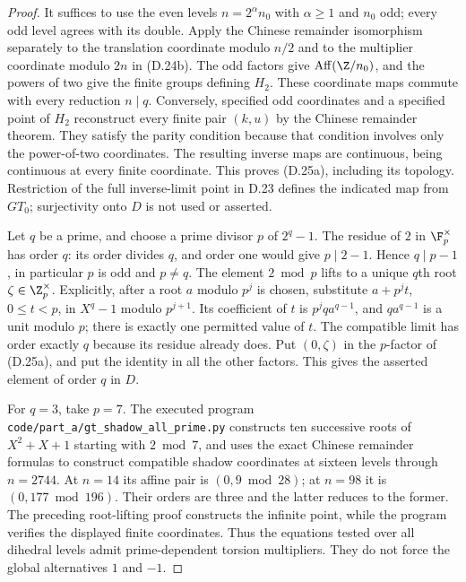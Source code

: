 \begin{proof}
It suffices to use the even levels $n=2^\alpha n_0$ with
$\alpha\geq1$ and $n_0$ odd; every odd level agrees with its
double. Apply the Chinese remainder isomorphism separately to
the translation coordinate modulo $n/2$ and to the multiplier
coordinate modulo $2n$ in (D.24b). The odd factors give
$\operatorname{Aff}(\Z/n_0)$, and the powers of two give
the finite groups defining $H_2$. These coordinate maps commute
with every reduction $n\mid q$. Conversely, specified odd
coordinates and a specified point of $H_2$ reconstruct every
finite pair $(k,u)$ by the Chinese remainder theorem. They
satisfy the parity condition because that condition involves
only the power-of-two coordinates. The resulting inverse
maps are continuous, being continuous at every finite
coordinate. This proves (D.25a), including its topology.
Restriction of the full inverse-limit point in D.23 defines
the indicated map from $GT_0$; surjectivity onto $D$ is not
used or asserted.

Let $q$ be a prime, and choose a prime divisor $p$ of $2^q-1$.
The residue of $2$ in $\F_p^\times$ has order $q$: its order
divides $q$, and order one would give $p\mid2-1$. Hence
$q\mid p-1$, in particular $p$ is odd and $p\ne q$.
The element $2\bmod p$ lifts to a unique $q$th root
$\zeta\in\Z_p^\times$. Explicitly, after a root $a$ modulo
$p^j$ is chosen, substitute $a+p^jt$, $0\leq t<p$,
in $X^q-1$ modulo $p^{j+1}$. Its coefficient of $t$ is
$p^jqa^{q-1}$, and $qa^{q-1}$ is a unit modulo $p$;
there is exactly one permitted value of $t$.
The compatible limit has order exactly $q$ because its
residue already does. Put $(0,\zeta)$ in the $p$-factor
of (D.25a), and put the identity in all the other factors.
This gives the asserted element of order $q$ in $D$.

For $q=3$, take $p=7$. The executed program
\texttt{code/part\_a/gt\_shadow\_all\_prime.py} constructs ten
successive roots of $X^2+X+1$ starting with $2\bmod7$, and
uses the exact Chinese remainder formulas to construct
compatible shadow coordinates at sixteen levels through
$n=2744$. At $n=14$ its affine pair is $(0,9\bmod28)$;
at $n=98$ it is $(0,177\bmod196)$. Their orders are three
and the latter reduces to the former. The preceding
root-lifting proof constructs the infinite point, while
the program verifies the displayed finite coordinates.
Thus the equations tested over all dihedral levels admit
prime-dependent torsion multipliers. They do not force
the global alternatives $1$ and $-1$.


\end{proof}
